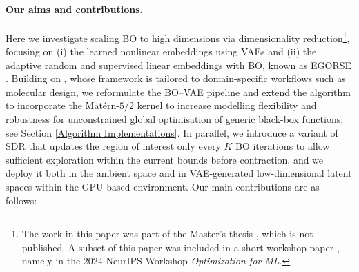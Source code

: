 \documentclass[pdflatex,sn-mathphys-num]{sn-jnl}%
\theoremstyle{thmstyleone}%
\theoremstyle{thmstyletwo}%
\theoremstyle{thmstylethree}%
\begin{document}
\paragraph{Our aims and contributions.} 
Here we investigate scaling BO to high dimensions via dimensionality reduction\footnote{The work in this paper was part of the Master's thesis \cite{oxfordmasterthesis}, which is not published. A subset of this paper was included in a short workshop paper \cite{long2024dimensionalityreductiontechniquesglobal}, namely in the 2024 NeurIPS Workshop \textit{Optimization for ML}.}, focusing on (i) the learned nonlinear embeddings using VAEs and (ii) the adaptive random and supervised linear embeddings with BO, known as EGORSE \cite{egorse}. Building on \cite{grosnit2021highdimensionalbayesianoptimisationvariational}, whose framework is tailored to domain-specific workflows such as molecular design, we reformulate the BO–VAE pipeline and extend the algorithm to incorporate the Matérn-$5/2$ kernel to increase modelling flexibility and robustness for unconstrained global optimisation of generic black-box functions; see Section \ref{Algorithm Implementations}. In parallel, we introduce a variant of SDR that updates the region of interest only every $K$ BO iterations to allow sufficient exploration within the current bounds before contraction, and we deploy it both in the ambient space and in VAE-generated low-dimensional latent spaces within the GPU-based environment. Our main contributions are as follows:
\end{document}

